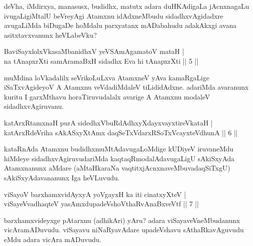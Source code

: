 \begin{artha}
deVha, iMdirxya, manasusx, budidhx, matutx adara duHKAdigaLa jAcnxnagaLu ivugaLigiMtalU beVreyAgi Atamxnu idAdxneMbudu sidadhxvAgidadxre avugaLiMda biDugaDe hoMdalu parxyatanx mADabahudu adakAkxgi avana asitxtavxvanunx heVLabeVku?
\end{artha}


\begin{shl}
BaviSayxlolxVkasaMbanidhxV yeVSAmAgamatoV mataH |\\
na tAnapxrXti samAramaBxH sidadhx Eva hi tAnapxrXti \hfill || 5 ||
\end{shl}

\begin{artha}
muMdina loVkadalilx seVrikoLuLxva AtamxneV yAva kamaRgaLige iSaTxvAgideyoV A Atamxnu veVdadiMdaleV tiLididAdxne. adariMda avaranunx kuritu I garxMthavu horaTiruvudalalx avarige A Atamxnu modaleV sidadhxvAgiruvanu.
\end{artha}

\begin{shl}
katArxRtamxnaH purA sidedhxVbuRdAdhxyXdayxvayxtireVkataH |\\
katArxRdeVriha sAkASxyXtAmx daqSeTxVdarxRSoTxVcayxteV\s dhunA \hfill || 6 ||
\end{shl}

\begin{artha}
kataRnAda Atamxnu budidhxmuMtAdavugaLoMdige kUDiyeV iruvaneMdu hiMdeye sidadhxvAgiruvudariMda kaqtaqRmodalAdavugaLigU sAkiSxyAda Atamxnanunx aMdare (aMtaHkaraNa vaqtitxjAcnxnaveMbuva\ndash daqSiTxgU) sAkiSxyAdavananunx Iga heVLuvudu.
\end{artha}

\begin{shl}
viSayoV barxhamxvidAyxyA yoVgayxH ka iti cinatxyXteV |\\
viSayeV\s vadhaqteV yasAmxdupadeVshoV\s thaRvAnaBxveVtf \hfill || 7 ||
\end{shl}

\begin{artha}
barxhamxvideyxge pAtarxnu (adhikAri) yAru? adara viSayaveVneMbudanunx vicAramADuvudu. viSayavu niNaRyavAdare upadeVshavu sAthaRkavAguvudu eMdu adara vicAra mADuvudu.
\end{artha}


